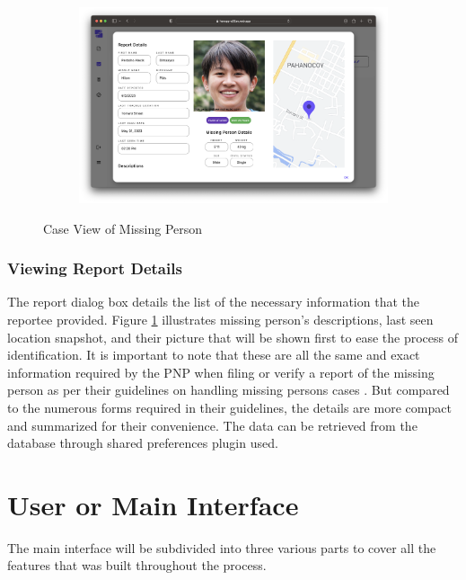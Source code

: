 \begin{figure}[!h]
    \centering
    \begin{subfigure}[c]{1\linewidth}
        \centering
        \includegraphics[scale=0.25]{figures/Chapter4/PNP/CaseView-1.png}
    \end{subfigure}
    \caption{Case View of Missing Person}
    \label{fig:reportDetails}
\end{figure}

\subsubsection{Viewing Report Details}

The report dialog box details the list of the necessary information that the reportee provided. Figure \ref{fig:reportDetails} illustrates missing person's descriptions, last seen location snapshot, and their picture that will be shown first to ease the process of identification. It is important to note that these are all the same and exact information required by the PNP when filing or verify a report of the missing person as per their guidelines on handling missing persons cases \cite{NationalPoliceCommission}. But compared to the numerous forms required in their guidelines, the details are more compact and summarized for their convenience. The data can be retrieved from the database through shared preferences plugin used.

\section{User or Main Interface}
The main interface will be subdivided into three various parts to cover all the features that was built throughout the process.

